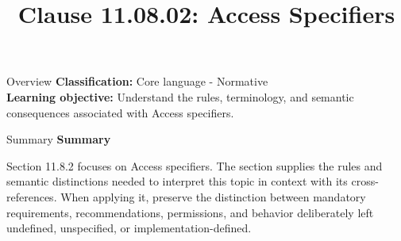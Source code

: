 \documentclass[10pt,letterpaper]{article}
\title{Clause 11.08.02: Access Specifiers}
\author{}
\date{}
\begin{document}
\maketitle
\begin{CornellOverviewBox}{Overview}
\textbf{Classification:} Core language - Normative\\[2pt]
\textbf{Learning objective:} Understand the rules, terminology, and semantic consequences associated with Access specifiers.
\end{CornellOverviewBox}\begin{CornellSummaryBox}{Summary}
{\sffamily\bfseries\color{Accent} Summary}\par\vspace{3pt}Section 11.8.2 focuses on Access specifiers. The section supplies the rules and semantic distinctions needed to interpret this topic in context with its cross-references. When applying it, preserve the distinction between mandatory requirements, recommendations, permissions, and behavior deliberately left undefined, unspecified, or implementation-defined.
\end{CornellSummaryBox}
\end{document}
